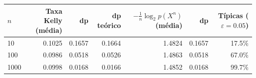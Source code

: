 \begin{tabular}{lrrrrrr}
\toprule
$n$ & Taxa Kelly (média) & dp & dp teórico & $-\frac1n\log_2 p(X^n)$ (média) & dp & Típicas ($\varepsilon=0.05$) \\
\midrule
10 & 0.1025 & 0.1657 & 0.1664 & 1.4824 & 0.1657 & 17.5\% \\
100 & 0.0986 & 0.0518 & 0.0526 & 1.4863 & 0.0518 & 67.0\% \\
1000 & 0.0998 & 0.0168 & 0.0166 & 1.4852 & 0.0168 & 99.7\% \\
\bottomrule
\end{tabular}
